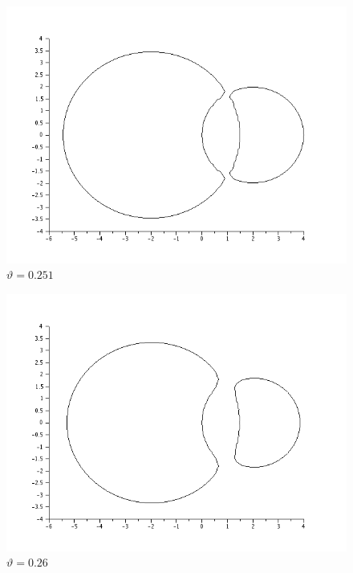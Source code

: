 \documentclass{article}
\begin{document}
\begin{itemize}
\begin{figure}[H]
\includegraphics[width=\textwidth]{img/ej6-7.png}
\caption{$\vartheta = 0.251$ }
\end{figure}

\begin{figure}[H]
\includegraphics[width=\textwidth]{img/ej6-8.png}
\caption{$\vartheta = 0.26$ }
\end{figure}


\end{itemize}
\end{document}
